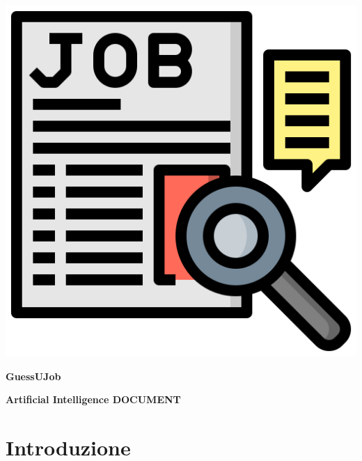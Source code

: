 \documentclass{article}
\begin{document}
\thispagestyle{empty}

\begin{center}%
    \includegraphics[scale=0.5]{job_seeking.png}

    \vspace{1cm}

    \textbf{\huge{GuessUJob}} %

    \vspace{0.5cm}

    \textbf{\large Artificial Intelligence DOCUMENT}
\end{center}

\newpage %

\tableofcontents

\newpage

\section{Introduzione}
\end{document}
